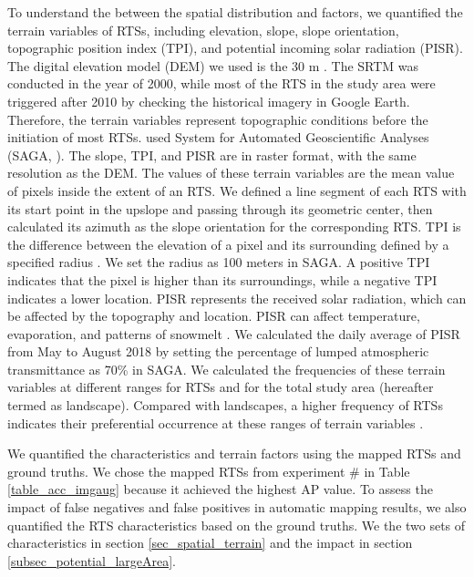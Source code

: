 \documentclass[authoryear,preprint,review,12pt]{elsarticle}
\begin{document}
To understand the  between the spatial distribution and  factors, we quantified the terrain variables of RTSs, including elevation, slope, slope orientation, topographic position index (TPI), and potential incoming solar radiation (PISR). The digital elevation model (DEM) we used is the 30 m  \citep{farr2007shuttle}. The SRTM  was conducted in the year of 2000, while most of the RTS in the study area were triggered after 2010 by checking the historical imagery in Google Earth. Therefore, the terrain variables represent topographic conditions before the initiation of most RTSs.   used System for Automated Geoscientific Analyses (SAGA, \citealp{conrad2015system}).  The slope, TPI, and PISR are in raster format, with the same resolution as the DEM. The values of these terrain variables are the mean value of pixels inside the extent of an RTS. We defined a line segment of each RTS with its start point in the upslope and passing through its geometric center, then calculated its azimuth as the slope orientation for the corresponding RTS. TPI is the difference between the elevation of a pixel and its surrounding defined by a specified radius \citep{guisan1999glm, reu2013application}. We set the radius as 100 meters in SAGA. A positive TPI indicates that the pixel is higher than its surroundings, while a negative TPI indicates a lower location. PISR represents the received solar radiation, which can be affected by the topography and location. PISR can affect temperature, evaporation, and patterns of snowmelt \citep{bohner2009land}. We calculated the daily average of PISR from May to August 2018 by setting the percentage of lumped atmospheric transmittance as 70\% in SAGA. We calculated the frequencies of these terrain variables at different ranges for RTSs and for the total study area (hereafter termed as landscape). Compared with landscapes, a higher frequency of RTSs indicates their preferential occurrence at these ranges of terrain variables \citep{lacelle_distribution_2015}. 


We quantified the characteristics and terrain factors using the mapped RTSs and ground truths. We chose the mapped RTSs from experiment \# in Table \ref{table_acc_imgaug} because it achieved the highest AP value. To assess the impact of false negatives and false positives in automatic mapping results, we also quantified the RTS characteristics based on the ground truths. We  the two sets of characteristics in section \ref{sec_spatial_terrain} and  the impact in section \ref{subsec_potential_largeArea}. %
\end{document}
